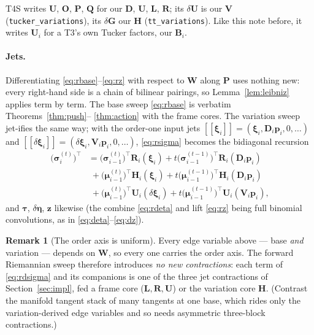 \documentclass[11pt]{article}
\newcommand{\jet}[1]{[\![ #1 ]\!]}   %
\theoremstyle{definition}
\newtheorem{remark}{Remark}
\theoremstyle{plain}
\begin{document}
T4S writes $\mathbf U$, $\mathbf O$, $\mathbf P$, $\mathbf Q$ for our $\mathbf D$, $\mathbf U$, $\mathbf L$, $\mathbf R$;
its $\delta\mathbf U$ is our $\mathbf V$ (\texttt{tucker\_variations}), its $\delta\mathbf G$ our $\mathbf H$
(\texttt{tt\_variations}). Like this note before, it writes $\mathbf U_i$ for a T3's own Tucker factors,
our $\mathbf B_i$.

\paragraph{Jets.}
Differentiating \eqref{eq:rbase}--\eqref{eq:rz} with respect to $\mathbf W$ along $\mathbf P$ uses
nothing new: every right-hand side is a chain of bilinear pairings, so Lemma~\ref{lem:leibniz}
applies term by term. The base sweep \eqref{eq:rbase} is verbatim Theorems~\ref{thm:push}--%
\ref{thm:action} with the frame cores. The variation sweep jet-ifies the same way; with the
order-one input jets $\jet{\boldsymbol\xi_i} = (\boldsymbol\xi_i, \mathbf D_i\mathbf p_i, 0, \dots)$
and $\jet{\delta\boldsymbol\xi_i} = (\delta\boldsymbol\xi_i, \mathbf V_i\mathbf p_i, 0, \dots)$,
\eqref{eq:rsigma} becomes the bidiagonal recursion
\begin{align}
  \big(\boldsymbol\sigma_i^{(t)}\big)^\top
  &= \big(\boldsymbol\sigma_{i-1}^{(t)}\big)^\top \mathbf R_i(\boldsymbol\xi_i)
   + t \big(\boldsymbol\sigma_{i-1}^{(t-1)}\big)^\top \mathbf R_i(\mathbf D_i\mathbf p_i) \nonumber\\
  &\;+ \big(\boldsymbol\mu_{i-1}^{(t)}\big)^\top \mathbf H_i(\boldsymbol\xi_i)
     + t \big(\boldsymbol\mu_{i-1}^{(t-1)}\big)^\top \mathbf H_i(\mathbf D_i\mathbf p_i) \nonumber\\
  &\;+ \big(\boldsymbol\mu_{i-1}^{(t)}\big)^\top \mathbf U_i(\delta\boldsymbol\xi_i)
     + t \big(\boldsymbol\mu_{i-1}^{(t-1)}\big)^\top \mathbf U_i(\mathbf V_i\mathbf p_i),
  \label{eq:rdsigma}
\end{align}
and $\boldsymbol\tau$, $\delta\boldsymbol\eta$, $\mathbf z$ likewise (the combine \eqref{eq:rdeta} and
lift \eqref{eq:rz} being full binomial convolutions, as in \eqref{eq:deta}--\eqref{eq:dz}).

\begin{remark}[The order axis is uniform]
\label{rem:uniform}
Every edge variable above --- base \emph{and} variation --- depends on $\mathbf W$, so every one
carries the order axis. The forward Riemannian sweep therefore introduces \emph{no new contractions}:
each term of \eqref{eq:rdsigma} and its companions is one of the three jet contractions of
Section~\ref{sec:impl}, fed a frame core ($\mathbf L,\mathbf R,\mathbf U$) or the variation core
$\mathbf H$. (Contrast the manifold tangent stack of many tangents at one base, which rides
only the variation-derived edge variables and so needs asymmetric three-block contractions.)
\end{remark}
\end{document}
